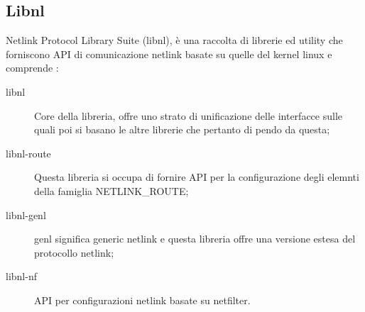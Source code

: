 \subsection{Libnl}
Netlink Protocol Library Suite (libnl), \`e una raccolta di librerie ed utility che forniscono API di comunicazione netlink basate su quelle del kernel linux e comprende \cite{K10}:
\begin{description}                     %
  \item[libnl] Core della libreria, offre uno strato di unificazione delle interfacce sulle quali poi si basano le altre librerie che pertanto di pendo da questa;
  \item[libnl-route] Questa libreria si occupa di fornire API per la configurazione degli elemnti della famiglia NETLINK\_ROUTE;
  \item[libnl-genl] genl significa generic netlink e questa libreria offre una versione estesa del protocollo netlink;
  \item[libnl-nf] API per configurazioni netlink basate su netfilter.

\end{description}

\clearpage{\pagestyle{empty}\cleardoublepage} 
